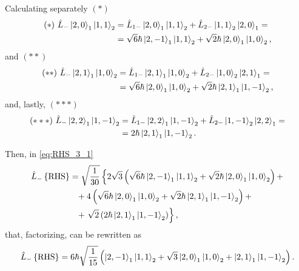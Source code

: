 Calculating separately $\left( * \right)$
\begin{align}
    \notag (*) \ \hat{L}_{-} \Ket{2,0}_1 \Ket{1,1}_2 &= \hat{L}_{1-} \Ket{2,0}_1 \Ket{1,1}_2 + \hat{L}_{2-} \Ket{1,1}_2 \Ket{2,0}_1 = \\
                                       &= \sqrt{6} \hbar \Ket{2,-1}_1 \Ket{1,1}_2 + \sqrt{2} \hbar \Ket{2,0}_1 \Ket{1,0}_2,
\end{align}
and $\left( ** \right)$
\begin{align}
    \notag (**) \ \hat{L}_{-} \Ket{2,1}_1 \Ket{1,0}_2 &= \hat{L}_{1-} \Ket{2,1}_1 \Ket{1,0}_2 + \hat{L}_{2-} \Ket{1,0}_2 \Ket{2,1}_1 = \\
                                        &= \sqrt{6} \hbar \Ket{2,0}_1 \Ket{1,0}_2 + \sqrt{2} \hbar \Ket{2,1}_1 \Ket{1,-1}_2,
\end{align}
and, lastly, $\left( *** \right)$
\begin{align}
    \notag (***) \ \hat{L}_{-} \Ket{2,2}_1 \Ket{1,-1}_2 &= \hat{L}_{1-} \Ket{2,2}_1 \Ket{1,-1}_2 + \hat{L}_{2-} \Ket{1,-1}_2 \Ket{2,2}_1 = \\
                                          &= 2 \hbar \Ket{2,1}_1 \Ket{1,-1}_2.
\end{align}

Then, in \cref{eq:RHS_3_1} 
\begin{equation}
    \begin{split}
        \hat{L}_{-} \left\{ \text{RHS} \right\} &=
        \sqrt{\frac{1}{30}} \left\{ 
            2 \sqrt{3} 
        \left( \sqrt{6} \hbar \Ket{2,-1}_1 \Ket{1,1}_2 + \sqrt{2} \hbar \Ket{2,0}_1 \Ket{1,0}_2 \right) + \right. \\
                                        & \phantom{=} + 4 \left( \sqrt{6} \hbar \Ket{2,0}_1 \Ket{1,0}_2 + \sqrt{2} \hbar \Ket{2,1}_1 \Ket{1,-1}_2 \right) + \\
                                        & \phantom{=} + \left. \sqrt{2} \left( 2 \hbar \Ket{2,1}_1 \Ket{1,-1}_2 \right) \right\},
    \end{split}
\end{equation}
that, factorizing, can be rewritten as
\begin{equation}
    \hat{L}_{-} \left\{ \text{RHS} \right\} =
    6 \hbar \sqrt{\frac{1}{15}} \left( 
    \Ket{2,-1}_1 \Ket{1,1}_2 + \sqrt{3} \Ket{2,0}_1 \Ket{1,0}_2 + \Ket{2,1}_1 \Ket{1,-1}_2 \right).
\end{equation}

